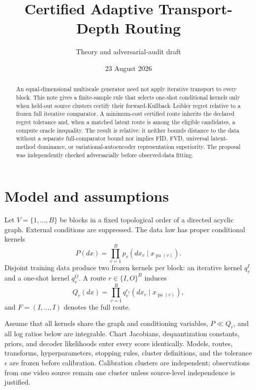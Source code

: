 \documentclass[11pt]{article}
\title{Certified Adaptive Transport-Depth Routing}
\author{Theory and adversarial-audit draft}
\date{23 August 2026}
\begin{document}
\maketitle

\begin{abstract}
An equal-dimensional multiscale generator need not apply iterative transport to every block.  This note gives a finite-sample rule that selects one-shot conditional kernels only when held-out source clusters certify their forward-Kullback--Leibler regret relative to a frozen full iterative comparator.  A minimum-cost certified route inherits the declared regret tolerance and, when a matched latent route is among the eligible candidates, a compute oracle inequality.  The result is relative: it neither bounds distance to the data without a separate full-comparator bound nor implies FID, FVD, universal latent-method dominance, or variational-autoencoder representation superiority.  The proposal was independently checked adversarially before observed-data fitting.
\end{abstract}

\section{Model and assumptions}

Let $V=\{1,\ldots,B\}$ be blocks in a fixed topological order of a directed acyclic graph.  External conditions are suppressed.  The data law has proper conditional kernels
\begin{equation}
 P(dx)=\prod_{v=1}^{B}p_v(dx_v\mid x_{\operatorname{pa}(v)}).
 \label{eq:p}
\end{equation}
Disjoint training data produce two frozen kernels per block: an iterative kernel $q_v^I$ and a one-shot kernel $q_v^O$.  A route $r\in\{I,O\}^B$ induces
\begin{equation}
 Q_r(dx)=\prod_{v=1}^{B}q_v^{r_v}(dx_v\mid x_{\operatorname{pa}(v)}),
 \label{eq:qr}
\end{equation}
and $F=(I,\ldots,I)$ denotes the full route.

Assume that all kernels share the graph and conditioning variables, $P\ll Q_r$, and all log ratios below are integrable.  Chart Jacobians, dequantization constants, priors, and decoder likelihoods enter every score identically.  Models, routes, transforms, hyperparameters, stopping rules, cluster definitions, and the tolerance $\epsilon$ are frozen before calibration.  Calibration clusters are independent; observations from one video source remain one cluster unless source-level independence is justified.
\end{document}
